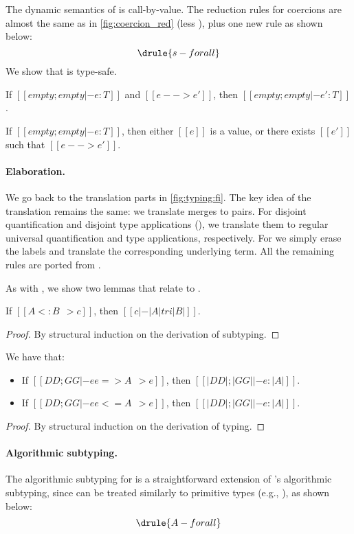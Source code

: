 The dynamic semantics of \tnamee is call-by-value. The reduction rules for coercions are almost the same as in
\cref{fig:coercion_red} (less ), plus one new rule  as shown below:
\[
  \drule{s-forall}
\]
We show that \tnamee is type-safe.

\begin{theorem}
  If $[[empty; empty |- e : T]]$ and $[[e --> e']]$, then $[[empty; empty |- e' : T]]$.
\end{theorem}

\begin{theorem}
  If $[[empty; empty |- e : T]]$, then either $[[e]]$ is a value, or there exists $[[e']]$ such
  that $[[e --> e']]$.
\end{theorem}


\paragraph{Elaboration.}

We go back to the translation parts in \cref{fig:typing:fi}. The key idea of the
translation remains the same: we translate merges to pairs. For disjoint
quantification and disjoint type applications (), we
translate them to regular universal quantification and type applications,
respectively. For  we simply erase
the labels and translate the corresponding underlying term. All the remaining
rules are ported from \namee.


As with \namee, we show two lemmas that relate \fnamee to \tnamee.

\begin{lemma}
  If $[[A <: B ~~> c]]$, then $[[c |-  |A| tri |B|]]$.
  \label{lemma:sub-correct:fi}
\end{lemma}
\begin{proof}
  By structural induction on the derivation of subtyping.
\end{proof}


\begin{lemma} We have that:
  \begin{itemize}
  \item If $[[DD ; GG |- ee => A ~~> e]]$, then $[[ |DD| ; |GG| |- e : |A | ]]$.
  \item If $[[DD ; GG |- ee <= A ~~> e]]$, then $[[ |DD| ; |GG| |- e : |A | ]]$.
  \end{itemize}
\end{lemma}
\begin{proof}
  By structural induction on the derivation of typing.
\end{proof}



\paragraph{Algorithmic subtyping.}

The algorithmic subtyping for \fnamee is a straightforward extension of \namee's
algorithmic subtyping, since  can be treated similarly to
primitive types (e.g., ), as shown below:
\[
  \drule{A-forall}
\]
